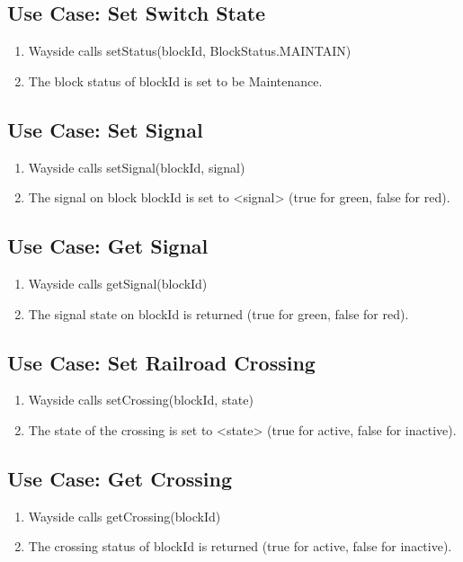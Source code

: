 \documentclass{scrreprt}
\begin{document}
\subsection{Use Case: Set Switch State}
\begin{enumerate}
	\item Wayside calls setStatus(blockId, BlockStatus.MAINTAIN)
	\item The block status of blockId is set to be Maintenance.
\end{enumerate}

\subsection{Use Case: Set Signal}
\begin{enumerate}
	\item Wayside calls setSignal(blockId, signal)
	\item The signal on block blockId is set to <signal> (true for green, false for red).
\end{enumerate}

\subsection{Use Case: Get Signal}
\begin{enumerate}
	\item Wayside calls getSignal(blockId)
	\item The signal state on blockId is returned (true for green, false for red).
\end{enumerate}

\subsection{Use Case: Set Railroad Crossing}
\begin{enumerate}
	\item Wayside calls setCrossing(blockId, state)
	\item The state of the crossing is set to <state> (true for active, false for inactive).
\end{enumerate}

\subsection{Use Case: Get Crossing}
\begin{enumerate}
	\item Wayside calls getCrossing(blockId)
	\item The crossing status of blockId is returned (true for active, false for inactive).
\end{enumerate}
\end{document}

